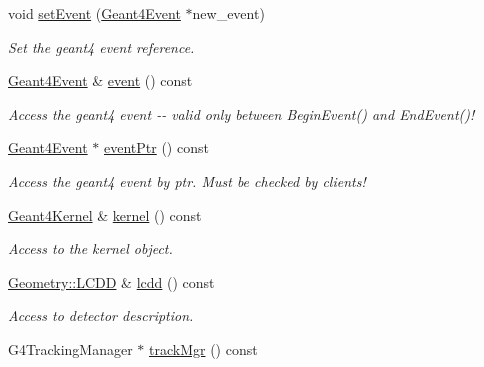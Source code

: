 \begin{DoxyCompactItemize}
void \hyperlink{class_d_d4hep_1_1_simulation_1_1_geant4_context_aa0bb03714fc9c82ed1d07ca804b73553}{setEvent} (\hyperlink{class_d_d4hep_1_1_simulation_1_1_geant4_event}{Geant4Event} $\ast$new\_\-event)
\begin{DoxyCompactList}\small\item\em Set the geant4 event reference. \item\end{DoxyCompactList}\item 
\hyperlink{class_d_d4hep_1_1_simulation_1_1_geant4_event}{Geant4Event} \& \hyperlink{class_d_d4hep_1_1_simulation_1_1_geant4_context_a425ebf810e3efadac1059f912adfd9f3}{event} () const 
\begin{DoxyCompactList}\small\item\em Access the geant4 event -\/-\/ valid only between BeginEvent() and EndEvent()! \item\end{DoxyCompactList}\item 
\hyperlink{class_d_d4hep_1_1_simulation_1_1_geant4_event}{Geant4Event} $\ast$ \hyperlink{class_d_d4hep_1_1_simulation_1_1_geant4_context_ac87c91b95aa074da6cfcd34c237414d7}{eventPtr} () const 
\begin{DoxyCompactList}\small\item\em Access the geant4 event by ptr. Must be checked by clients! \item\end{DoxyCompactList}\item 
\hyperlink{class_d_d4hep_1_1_simulation_1_1_geant4_kernel}{Geant4Kernel} \& \hyperlink{class_d_d4hep_1_1_simulation_1_1_geant4_context_a68417b8caff336526775843e0b65cd90}{kernel} () const 
\begin{DoxyCompactList}\small\item\em Access to the kernel object. \item\end{DoxyCompactList}\item 
\hyperlink{class_d_d4hep_1_1_geometry_1_1_l_c_d_d}{Geometry::LCDD} \& \hyperlink{class_d_d4hep_1_1_simulation_1_1_geant4_context_a2d955e79c4f81a5afd18dbdc5f067176}{lcdd} () const 
\begin{DoxyCompactList}\small\item\em Access to detector description. \item\end{DoxyCompactList}\item 
G4TrackingManager $\ast$ \hyperlink{class_d_d4hep_1_1_simulation_1_1_geant4_context_af3961d95f8680484d4f2a0fbc1186741}{trackMgr} () const 

\end{DoxyCompactItemize}
